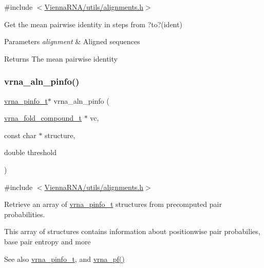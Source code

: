 {\ttfamily \#include $<$\mbox{\hyperlink{utils_2alignments_8h}{Vienna\+R\+N\+A/utils/alignments.\+h}}$>$}



Get the mean pairwise identity in steps from ?to?(ident) 


\begin{DoxyParams}{Parameters}
{\em alignment} & Aligned sequences \\
\hline
\end{DoxyParams}
\begin{DoxyReturn}{Returns}
The mean pairwise identity 
\end{DoxyReturn}
\mbox{\label{group__aln__utils_gaf6421a1318586c59fea6a127ed9f65f3}} 
\subsubsection{\texorpdfstring{vrna\_aln\_pinfo()}{vrna\_aln\_pinfo()}}
{\footnotesize\ttfamily \mbox{\hyperlink{group__aln__utils_ga6660dfca23debee7306e0cd53341263f}{vrna\+\_\+pinfo\+\_\+t}}$\ast$ vrna\+\_\+aln\+\_\+pinfo (\begin{DoxyParamCaption}\item[{\mbox{\hyperlink{group__fold__compound_ga1b0cef17fd40466cef5968eaeeff6166}{vrna\+\_\+fold\+\_\+compound\+\_\+t}} $\ast$}]{vc,  }\item[{const char $\ast$}]{structure,  }\item[{double}]{threshold }\end{DoxyParamCaption})}



{\ttfamily \#include $<$\mbox{\hyperlink{utils_2alignments_8h}{Vienna\+R\+N\+A/utils/alignments.\+h}}$>$}



Retrieve an array of \mbox{\hyperlink{group__aln__utils_ga6660dfca23debee7306e0cd53341263f}{vrna\+\_\+pinfo\+\_\+t}} structures from precomputed pair probabilities. 

This array of structures contains information about positionwise pair probabilies, base pair entropy and more

\begin{DoxySeeAlso}{See also}
\mbox{\hyperlink{group__aln__utils_ga6660dfca23debee7306e0cd53341263f}{vrna\+\_\+pinfo\+\_\+t}}, and \mbox{\hyperlink{group__part__func__global_ga29e256d688ad221b78d37f427e0e99bc}{vrna\+\_\+pf()}}
\end{DoxySeeAlso}

